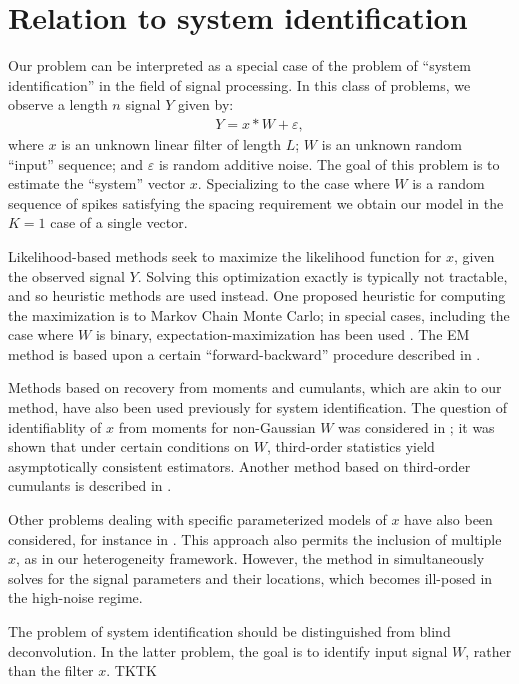 \documentclass{article}
\theoremstyle{thm}
\theoremstyle{definition}
\newcommand{\ep}{\varepsilon}
\newcommand{\1}{\mathbf{1}}
\begin{document}
%
%
%
%

\section{Relation to system identification}

Our problem can be interpreted as a special case of the problem of ``system identification'' in the field of signal processing. In this class of problems, we observe a length $n$ signal $Y$ given by:
%
\begin{align}
%
    Y = x \ast W + \ep,
%
\end{align}
%
where $x$ is an unknown linear filter of length $L$; $W$ is an unknown random ``input'' sequence; and $\ep$ is random additive noise. The goal of this problem is to estimate the ``system'' vector $x$. Specializing to the case where $W$ is a random sequence of spikes satisfying the spacing requirement we obtain our model in the $K=1$ case of a single vector.

Likelihood-based methods seek to maximize the likelihood function for $x$, given the observed signal $Y$. Solving this optimization exactly is typically not tractable, and so heuristic methods are used instead. One proposed heuristic for computing the maximization is to Markov Chain Monte Carlo; in special cases, including the case where $W$ is binary, expectation-maximization has been used \cite{cappe1999simulation}. The EM method is based upon a certain ``forward-backward'' procedure described in \cite{rabiner1989tutorial}.

Methods based on recovery from moments and cumulants, which are akin to our method, have also been used previously for system identification. The question of identifiablity of $x$ from moments for non-Gaussian $W$ was considered in \cite{lii1982deconvolution}; it was shown that under certain conditions on $W$, third-order statistics yield asymptotically consistent estimators. Another method based on third-order cumulants is described in \cite{giannakis1989id}.

Other problems dealing with specific parameterized models of $x$ have also been considered, for instance in \cite{andrieu2001bayesian}. This approach also permits the inclusion of multiple $x$, as in our heterogeneity framework. However, the method in \cite{andrieu2001bayesian} simultaneously solves for the signal parameters and their locations, which becomes ill-posed in the high-noise regime.

The problem of system identification should be distinguished from blind deconvolution. In the latter problem, the goal is to identify input signal $W$, rather than the filter $x$. TKTK 







\end{document}
